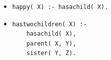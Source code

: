 
\begin{itemize}
    \item[(a)]
        \begin{verbatim}
happy( X) :- hasachild( X).
        \end{verbatim}
    \item[(b)]
        \begin{verbatim}
hastwochildren( X) :-
    hasachild( X),
    parent( X, Y),
    sister( Y, Z).
        \end{verbatim}
\end{itemize}
